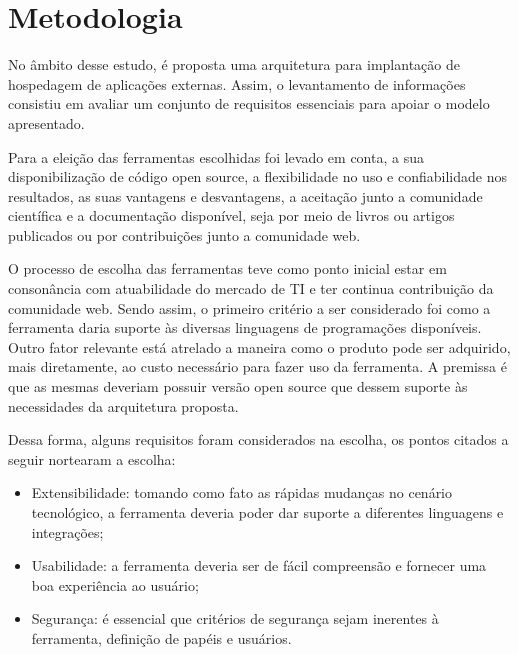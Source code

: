 



\chapter{Metodologia}\label{cap:metodologia}

No âmbito desse estudo, é proposta uma arquitetura para implantação de hospedagem de aplicações externas. Assim, o levantamento de informações consistiu em avaliar um conjunto de requisitos essenciais para apoiar o modelo apresentado.

Para a eleição das ferramentas escolhidas foi levado em conta, a sua disponibilização de código open source, a flexibilidade no uso e confiabilidade nos resultados, as suas vantagens e desvantagens, a aceitação junto a comunidade científica e a documentação disponível, seja por meio de livros ou artigos publicados ou por contribuições junto a comunidade web.

O processo de escolha das ferramentas teve como ponto inicial estar em consonância com atuabilidade do mercado de TI e ter continua contribuição da comunidade web. Sendo assim, o primeiro critério a ser considerado foi como a ferramenta daria suporte às diversas linguagens de programações disponíveis. Outro fator relevante está atrelado a maneira como o produto pode ser adquirido, mais diretamente, ao custo necessário para fazer uso da ferramenta. A premissa é que as mesmas deveriam possuir versão open source que  dessem suporte às necessidades da arquitetura proposta.

Dessa forma, alguns requisitos foram considerados na escolha, os pontos citados a seguir nortearam a escolha: 
    \vspace*{0.5cm}

\begin{itemize}
	
	\item Extensibilidade: tomando como fato as rápidas mudanças no cenário tecnológico, a ferramenta deveria poder dar suporte a diferentes linguagens e integrações;
	\item Usabilidade: a ferramenta deveria ser de fácil compreensão e fornecer uma boa experiência ao usuário;
	\item Segurança: é essencial que critérios de segurança sejam inerentes à ferramenta, definição de papéis e usuários.
	
\end{itemize}

